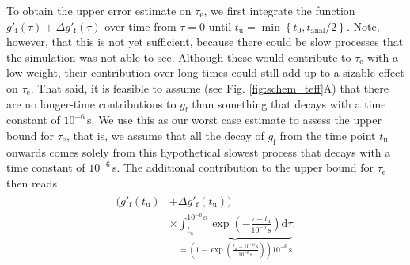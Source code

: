 \documentclass[journal=jcisd8,manuscript=article,layout=twocolumn]{achemso}
\begin{document}
To obtain the upper error estimate on $\tau_\mathrm e$, we first integrate the function
$g'_{\mathrm{f}}(\tau) + \Delta g'_{\mathrm{f}}(\tau)$ over time from $\tau=0$ until
$
t_\mathrm u= \min
\left\{
	t_0,
	{t_\mathrm{anal}}/{2}
\right\}.
$
Note, however,
that this is not yet sufficient, because there could be slow processes that the simulation was not
able to see. Although these would contribute to $\tau_\mathrm e$ with a low weight,
their contribution over long times could still add up to a sizable effect on $\tau_\mathrm e$.
%
That said, it is feasible to assume (see Fig. \ref{fig:schem_teff}A) that there are no longer-time contributions
to $g_\mathrm f$ than something that decays with a time constant of $10^{-6}$\,s.
%
We use this as our worst case estimate to assess the upper bound for $\tau_\mathrm e$, that is,
%
we assume that all the decay of $g_\mathrm f$ from the time point
$
t_\mathrm u$ %
onwards comes solely from this hypothetical slowest process that decays with a time constant of $10^{-6}$\,s.
%
The additional contribution to the upper bound for $\tau_\mathrm e$ then reads
\begin{align}
\label{eq:extraUpperError}
\begin{split}
( g'_\mathrm f(t_\mathrm u)&+\Delta g'_\mathrm f(t_\mathrm u) )\\
&\times \underbrace{\int_{t_\mathrm u}^{10^{-6}\,\mathrm s} \exp\left(-\frac{\tau-t_\mathrm u}{10^{-6}\,\mathrm s}\right)\mathrm{d}\tau}_{= \left( 1 - \exp\left( \frac{t_\mathrm u-10^{-6}\,\mathrm s}{10^{-6}\,\mathrm s} \right) \right) 10^{-6}\,\mathrm s}.
\end{split}
\end{align}

\end{document}
